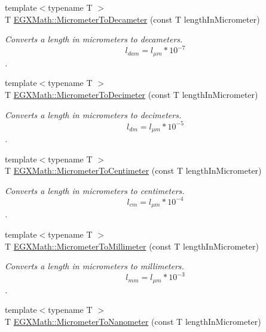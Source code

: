 \begin{DoxyCompactItemize}
{\footnotesize template$<$typename T $>$ }\\T \mbox{\hyperlink{group___e_g_x_math-_conversions-_length_conversions-_s_i-_micrometer-_s_i_ga871166cc6e314c09456a06cfb84ef62a}{E\+G\+X\+Math\+::\+Micrometer\+To\+Decameter}} (const T length\+In\+Micrometer)
\begin{DoxyCompactList}\small\item\em Converts a length in micrometers to decameters. \[ l_{dam}=l_{\mu m} * 10^{-7} \]. \end{DoxyCompactList}\item 
{\footnotesize template$<$typename T $>$ }\\T \mbox{\hyperlink{group___e_g_x_math-_conversions-_length_conversions-_s_i-_micrometer-_s_i_ga9defee7c838f9b14acd0dc19931309fa}{E\+G\+X\+Math\+::\+Micrometer\+To\+Decimeter}} (const T length\+In\+Micrometer)
\begin{DoxyCompactList}\small\item\em Converts a length in micrometers to decimeters. \[ l_{dm}=l_{\mu m} * 10^{-5} \]. \end{DoxyCompactList}\item 
{\footnotesize template$<$typename T $>$ }\\T \mbox{\hyperlink{group___e_g_x_math-_conversions-_length_conversions-_s_i-_micrometer-_s_i_ga43ca5990e1bddd832e2fe0cf8fff879f}{E\+G\+X\+Math\+::\+Micrometer\+To\+Centimeter}} (const T length\+In\+Micrometer)
\begin{DoxyCompactList}\small\item\em Converts a length in micrometers to centimeters. \[ l_{cm}=l_{\mu m} * 10^{-4} \]. \end{DoxyCompactList}\item 
{\footnotesize template$<$typename T $>$ }\\T \mbox{\hyperlink{group___e_g_x_math-_conversions-_length_conversions-_s_i-_micrometer-_s_i_ga3c5ef053f2554257486e8633840d8ad6}{E\+G\+X\+Math\+::\+Micrometer\+To\+Millimeter}} (const T length\+In\+Micrometer)
\begin{DoxyCompactList}\small\item\em Converts a length in micrometers to millimeters. \[ l_{mm}=l_{\mu m} * 10^{-3} \]. \end{DoxyCompactList}\item 
{\footnotesize template$<$typename T $>$ }\\T \mbox{\hyperlink{group___e_g_x_math-_conversions-_length_conversions-_s_i-_micrometer-_s_i_gaf8c9401ae0ce0536229d6c24894d30bc}{E\+G\+X\+Math\+::\+Micrometer\+To\+Nanometer}} (const T length\+In\+Micrometer)

\end{DoxyCompactItemize}
